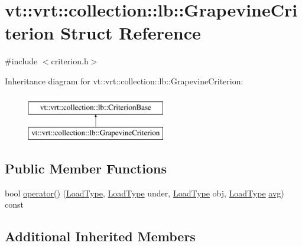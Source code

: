 \hypertarget{structvt_1_1vrt_1_1collection_1_1lb_1_1_grapevine_criterion}{}\section{vt\+:\+:vrt\+:\+:collection\+:\+:lb\+:\+:Grapevine\+Criterion Struct Reference}
\label{structvt_1_1vrt_1_1collection_1_1lb_1_1_grapevine_criterion}


{\ttfamily \#include $<$criterion.\+h$>$}

Inheritance diagram for vt\+:\+:vrt\+:\+:collection\+:\+:lb\+:\+:Grapevine\+Criterion\+:\begin{figure}[H]
\begin{center}
\leavevmode
\includegraphics[height=2.000000cm]{structvt_1_1vrt_1_1collection_1_1lb_1_1_grapevine_criterion}
\end{center}
\end{figure}
\subsection*{Public Member Functions}
\begin{DoxyCompactItemize}
\item 
bool \hyperlink{structvt_1_1vrt_1_1collection_1_1lb_1_1_grapevine_criterion_a2eb0e24abfcf4bea47588b77a0a6b1f0}{operator()} (\hyperlink{structvt_1_1vrt_1_1collection_1_1lb_1_1_criterion_base_a78e6b14fc6f7b34acac1d7cd4e850180}{Load\+Type}, \hyperlink{structvt_1_1vrt_1_1collection_1_1lb_1_1_criterion_base_a78e6b14fc6f7b34acac1d7cd4e850180}{Load\+Type} under, \hyperlink{structvt_1_1vrt_1_1collection_1_1lb_1_1_criterion_base_a78e6b14fc6f7b34acac1d7cd4e850180}{Load\+Type} obj, \hyperlink{structvt_1_1vrt_1_1collection_1_1lb_1_1_criterion_base_a78e6b14fc6f7b34acac1d7cd4e850180}{Load\+Type} \hyperlink{namespacevt_1_1vrt_1_1collection_1_1lb_a74989c7b4dd16fcc067e90a29cd1febeae322d423f075b0ab2daad27011d24909}{avg}) const
\end{DoxyCompactItemize}
\subsection*{Additional Inherited Members}


